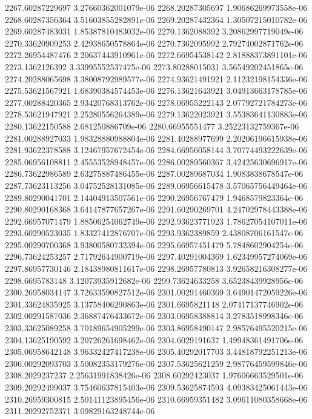 {2267.60287229697 3.27660362001079e-06
2268.20287305697 1.90686269973558e-06
2268.60287356364 3.51603855282891e-06
2269.20287432364 1.30507215010782e-06
2269.60287483031 1.85387810483032e-06
2270.1362088392 3.20862997719049e-06
2270.33620909253 2.42938650578864e-06
2270.7362095992 2.79274002871762e-06
2272.26954487476 2.20637443910961e-06
2272.66954538142 2.81888373891101e-06
2273.1362126392 3.33995552537475e-06
2273.80288015031 3.56549202451865e-06
2274.20288065698 3.38008792989577e-06
2274.93621491921 2.11232198154336e-06
2275.53621567921 1.68390384574453e-06
2276.13621643921 3.04913663178785e-06
2277.00288420365 2.93420768313762e-06
2278.06955222143 2.07792721784273e-06
2278.53621947921 2.25280556264389e-06
2279.13622023921 3.55383641130883e-06
2280.13622150588 2.681250886709e-06
2280.66955551477 3.25223132759367e-06
2281.00288927033 1.98328880988804e-06
2281.40288977699 2.20206196615938e-06
2281.93622378588 3.12467957672454e-06
2284.66956058144 3.70774493222639e-06
2285.06956108811 2.45553528948457e-06
2286.00289560367 3.42425630696917e-06
2286.73622986589 2.63275887486455e-06
2287.00289687034 1.9083838678547e-06
2287.73623113256 3.04752528131085e-06
2289.06956615478 3.57065756449464e-06
2289.80290041701 2.14404913507561e-06
2290.26956767479 1.9468579823364e-06
2290.80290168368 3.64147877657267e-06
2291.60290269701 4.24702978443388e-06
2292.66957071479 1.88506254062749e-06
2292.93623771923 1.78627054107011e-06
2293.60290523035 1.83327412876707e-06
2293.9362389859 2.43808706161547e-06
2295.00290700368 3.93800580732394e-06
2295.66957451479 5.7848602904254e-06
2296.73624253257 2.71792644900719e-06
2297.40291004369 1.62349957274069e-06
2297.86957730146 2.18438980811617e-06
2298.26957780813 3.92658216308277e-06
2298.6695783148 3.12073935912682e-06
2299.73624633258 3.65238439928956e-06
2300.26958034147 3.72633590827512e-06
2301.00291460369 3.64901472059226e-06
2301.33624835925 3.13758406290863e-06
2301.6695821148 2.07417137746902e-06
2302.00291587036 2.36887476433672e-06
2303.06958388814 3.2783518998346e-06
2303.33625089258 3.70189654905299e-06
2303.86958490147 2.98576495520215e-06
2304.13625190592 3.20726261698462e-06
2304.6029191637 1.49948361491706e-06
2305.06958642148 3.96332427417238e-06
2305.40292017703 3.44818792251213e-06
2306.00292093703 3.50082353179276e-06
2307.53625621259 2.98776459599846e-06
2308.2029237237 2.25631991838426e-06
2308.60292423037 1.97606663529501e-06
2309.20292499037 3.75460637815403e-06
2309.53625874593 4.09383425061443e-06
2310.26959300815 2.50141123895456e-06
2310.66959351482 3.09611080358668e-06
2311.20292752371 3.09829163248744e-06
}
